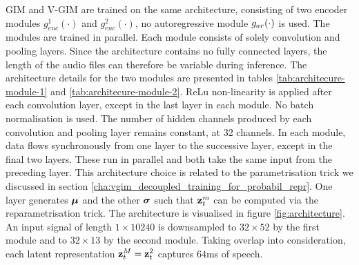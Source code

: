 		GIM and V-GIM are trained on the same architecture, consisting of two encoder modules $g_{enc}^1(\cdot)$ and $g_{enc}^2(\cdot)$, no autoregressive module $g_{ar}(\cdot)$ is used. The modules are trained in parallel. Each module consists of solely convolution and pooling layers. Since the architecture contains no fully connected layers, the length of the audio files can therefore be variable during inference. The architecture details for the two modules are presented in tables \ref{tab:architecure-module-1} and \ref{tab:architecure-module-2}. ReLu non-linearity is applied after each convolution layer, except in the last layer in each module. No batch normalisation is used. The number of hidden channels produced by each convolution and pooling layer remains constant, at 32 channels. In each module, data flows synchronously from one layer to the successive layer, except in the final two layers. These run in parallel and both take the same input from the preceding layer. This architecture choice is related to the parametrisation trick we discussed in section \ref{cha:vgim_decoupled_training_for_probabil_repr}. One layer generates $\bm{\mu}$ and the other $\bm{\sigma}$ such that $\mathbf{z}_t^{m}$ can be computed via the reparametrisation trick. The architecture is visualised in figure \ref{fig:architecture}. 
		An input signal of length $1 \times 10240$ is downsampled to $32 \times 52$ by the first module and to $32 \times 13$ by the second module. Taking overlap into consideration, each latent representation $\mathbf{z}_t^M = \mathbf{z}_t^2$ captures $64$ms of speech. %
		

	
		

